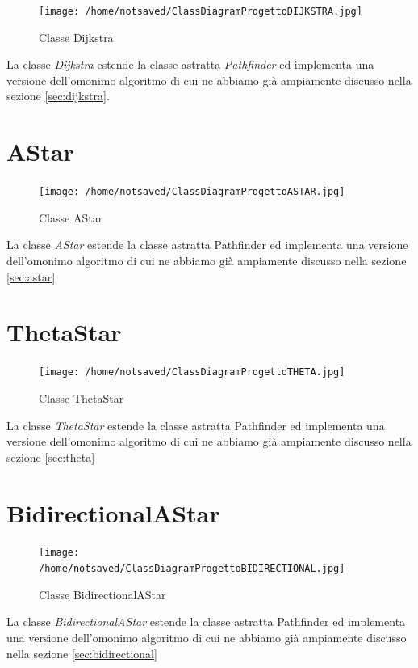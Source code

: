 \documentclass[12pt]{book}
\begin{document}
\begin{figure}[H]
\centering
\texttt{[image: /home/notsaved/ClassDiagramProgettoDIJKSTRA.jpg]}
\caption{Classe Dijkstra}
\label{classdijkstra}
\end{figure}

La classe \emph{Dijkstra} estende la classe astratta \emph{Pathfinder} ed implementa una versione dell'omonimo algoritmo di cui ne abbiamo gi\`a ampiamente discusso nella sezione \ref{sec:dijkstra}.

\section{AStar}

\begin{figure}[H]
\centering
\texttt{[image: /home/notsaved/ClassDiagramProgettoASTAR.jpg]}
\caption{Classe AStar}
\label{classastar}
\end{figure}

La classe \emph{AStar} estende la classe astratta Pathfinder ed implementa una versione dell'omonimo algoritmo di cui ne abbiamo gi\`a ampiamente discusso nella sezione \ref{sec:astar}

\section{ThetaStar}

\begin{figure}[H]
\centering
\texttt{[image: /home/notsaved/ClassDiagramProgettoTHETA.jpg]}
\caption{Classe ThetaStar}
\label{classtheta}
\end{figure}

La classe \emph{ThetaStar} estende la classe astratta Pathfinder ed implementa una versione dell'omonimo algoritmo di cui ne abbiamo gi\`a ampiamente discusso nella sezione \ref{sec:theta}

\section{BidirectionalAStar}

\begin{figure}[H]
\centering
\texttt{[image: /home/notsaved/ClassDiagramProgettoBIDIRECTIONAL.jpg]}
\caption{Classe BidirectionalAStar}
\label{classbidirectional}
\end{figure}

La classe \emph{BidirectionalAStar} estende la classe astratta Pathfinder ed implementa una versione dell'omonimo algoritmo di cui ne abbiamo gi\`a ampiamente discusso nella sezione \ref{sec:bidirectional}
\end{document}
